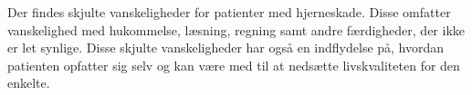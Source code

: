 Der findes skjulte vanskeligheder for patienter med hjerneskade. Disse omfatter vanskelighed med hukommelse, læsning, regning samt andre færdigheder, der ikke er let synlige. Disse skjulte vanskeligheder har også en indflydelse på, hvordan patienten opfatter sig selv og kan være med til at nedsætte livskvaliteten for den enkelte.\cite{Sundhedsstyrelsen2010} 





